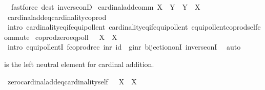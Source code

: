 \begin{isabellebody}
\ \ {\isacharparenleft}{\kern0pt}fastforce\ dest{\isacharcolon}{\kern0pt}\ inverse{\isacharunderscore}{\kern0pt}onD{\isacharparenright}{\kern0pt}%
\endisatagproof
{\isafoldproof}%
%
\isadelimproof
\isanewline
%
\endisadelimproof
\isanewline
{}\isamarkupfalse%
\ cardinal{\isacharunderscore}{\kern0pt}add{\isacharunderscore}{\kern0pt}comm{\isacharcolon}{\kern0pt}\ {\isachardoublequoteopen}X\ {\isasymoplus}\ Y\ {\isacharequal}{\kern0pt}\ Y\ {\isasymoplus}\ X{\isachardoublequoteclose}\isanewline
%
\isadelimproof
\ \ %
\endisadelimproof
%
\isatagproof
{}\isamarkupfalse%
\ cardinal{\isacharunderscore}{\kern0pt}add{\isacharunderscore}{\kern0pt}eq{\isacharunderscore}{\kern0pt}cardinality{\isacharunderscore}{\kern0pt}coprod\isanewline
\ \ \isamarkupfalse%
\ {\isacharparenleft}{\kern0pt}intro\ cardinality{\isacharunderscore}{\kern0pt}eq{\isacharunderscore}{\kern0pt}if{\isacharunderscore}{\kern0pt}equipollent\ cardinality{\isacharunderscore}{\kern0pt}eq{\isacharunderscore}{\kern0pt}if{\isacharunderscore}{\kern0pt}equipollent\ equipollent{\isacharunderscore}{\kern0pt}coprod{\isacharunderscore}{\kern0pt}self{\isacharunderscore}{\kern0pt}commute{\isacharparenright}{\kern0pt}%
\endisatagproof
{\isafoldproof}%
%
\isadelimproof
\isanewline
%
\endisadelimproof
\isanewline
{}\isamarkupfalse%
\ coprod{\isacharunderscore}{\kern0pt}zero{\isacharunderscore}{\kern0pt}eqpoll{\isacharcolon}{\kern0pt}\ {\isachardoublequoteopen}{\isacharbraceleft}{\kern0pt}{\isacharbraceright}{\kern0pt}\ {\isasymCoprod}\ X\ {\isasymapprox}\ X{\isachardoublequoteclose}\isanewline
%
\isadelimproof
\ \ %
\endisadelimproof
%
\isatagproof
{}\isamarkupfalse%
\ {\isacharparenleft}{\kern0pt}intro\ equipollentI{\isacharbrackleft}{\kern0pt}\ {\isacharquery}{\kern0pt}f{\isacharequal}{\kern0pt}{\isachardoublequoteopen}coprod{\isacharunderscore}{\kern0pt}rec\ inr\ id{\isachardoublequoteclose}\ \ {\isacharquery}{\kern0pt}g{\isacharequal}{\kern0pt}{\isachardoublequoteopen}inr{\isachardoublequoteclose}{\isacharbrackright}{\kern0pt}\ bijection{\isacharunderscore}{\kern0pt}onI\ inverse{\isacharunderscore}{\kern0pt}onI{\isacharparenright}{\kern0pt}\isanewline
\ \ auto%
\endisatagproof
{\isafoldproof}%
%
\isadelimproof
%
\endisadelimproof
%
\begin{isamarkuptext}%
 is the left neutral element for cardinal addition.%
\end{isamarkuptext}\isamarkuptrue%
\isamarkupfalse%
\ zero{\isacharunderscore}{\kern0pt}cardinal{\isacharunderscore}{\kern0pt}add{\isacharunderscore}{\kern0pt}eq{\isacharunderscore}{\kern0pt}cardinality{\isacharunderscore}{\kern0pt}self{\isacharcolon}{\kern0pt}\ {\isachardoublequoteopen}{}\ {\isasymoplus}\ X\ {\isacharequal}{\kern0pt}\ {\isacharbar}{\kern0pt}X{\isacharbar}{\kern0pt}{\isachardoublequoteclose}\isanewline

\end{isabellebody}
